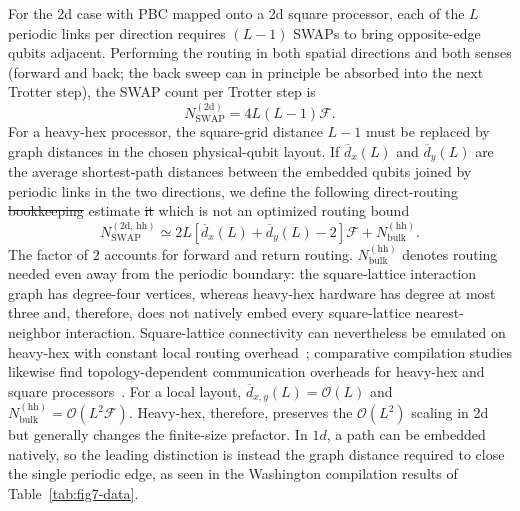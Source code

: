 \documentclass[twocolumn,superscriptaddress,showpacs,nofootinbib,notitlepage,preprintnumbers,secnumarabic,amssymb, floatfix, nobibnotes, aps, prd]{revtex4-2}
\begin{document}
For the 2d case with PBC mapped onto a 2d square processor, each of the
$L$ periodic links per direction requires $(L-1)$ SWAPs to bring
opposite-edge qubits adjacent.  Performing the routing in both spatial
directions and both senses (forward and back; the back sweep can in
principle be absorbed into the next Trotter step), the SWAP count per
Trotter step is
\begin{equation}
N_{\text{SWAP}}^{(2\text{d})} = 4L(L-1)\mathcal{F}.
\end{equation}
For a heavy-hex processor, the square-grid distance $L-1$ must be replaced by
graph distances in the chosen physical-qubit layout.  If
$\overline d_x(L)$ and $\overline d_y(L)$ are the average shortest-path
distances between the embedded qubits joined by periodic links in the two
directions, we define the following direct-routing {\color{red}\st{bookkeeping}} estimate {\color{red} \st{it} which} 
is not an optimized routing bound
\begin{equation}
N_{\text{SWAP}}^{(2\text{d},\,\mathrm{hh})}
\simeq 2L\left[\overline d_x(L)+\overline d_y(L)-2\right]\mathcal{F}
+N_{\mathrm{bulk}}^{(\mathrm{hh})}.
\end{equation}
The factor of $2$ accounts for forward and return routing.
$N_{\mathrm{bulk}}^{(\mathrm{hh})}$ denotes routing needed even away from the periodic boundary: the square-lattice interaction graph has degree-four vertices, whereas heavy-hex hardware has degree at most three and, therefore, does not natively embed every square-lattice nearest-neighbor interaction.
Square-lattice connectivity can nevertheless be emulated on heavy-hex with constant local routing overhead~\cite{ibm-heavy-hex}; comparative compilation studies likewise find topology-dependent communication overheads for heavy-hex and square processors~\cite{Rached:2024routing}.
For a local layout, $\overline d_{x,y}(L)=\mathcal{O}(L)$ and $N_{\mathrm{bulk}}^{(\mathrm{hh})}=\mathcal{O}(L^2\mathcal{F})$.  
Heavy-hex, therefore, preserves the $\mathcal{O}(L^2)$ scaling in 2d but generally changes the finite-size prefactor.  
In $1d$, a path can be embedded natively, so the leading distinction is instead the graph distance required to close the single periodic edge, as seen in the Washington compilation results of Table~\ref{tab:fig7-data}.
\end{document}
